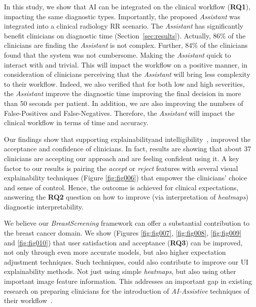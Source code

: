 In this study, we show that AI can be integrated on the clinical workflow ({\bf RQ1}), impacting the same diagnostic types.
Importantly, the proposed {\it Assistant} was integrated into a clinical radiology RR scenario.
The {\it Assistant} has significantly benefit clinicians on diagnostic time (Section~\ref{sec:results}).
Actually, 86\% of the clinicians are finding the {\it Assistant} is not complex.
Further, 84\% of the clinicians found that the system was not cumbersome.
Making the {\it Assistant} quick to interact with and trivial.
This will impact the workflow on a positive manner, in consideration of clinicians perceiving that the {\it Assistant} will bring less complexity to their workflow.
Indeed, we also verified that for both low and high severities, the {\it Assistant} improve the diagnostic time improving the final decision in more than 50 seconds per patient.
In addition, we are also improving the numbers of False-Positives and False-Negatives.
Therefore, the {\it Assistant} will impact the clinical workflow in terms of time and accuracy.

Our findings show that supporting explainability\footnotemark[20] and intelligibility\footnotemark[21]~\cite{Abdul:2018:TTE:3173574.3174156}, improved the acceptance and confidence of clinicians.
In fact, results are showing that about 37 clinicians are accepting our approach and are feeling confident using it.
A key factor to our results is pairing the {\it accept} or {\it reject} features with several visual explainability techniques (Figure \ref{fig:fig006}) that empower the clinicians' choice and sense of control.
Hence, the outcome is achieved for clinical expectations, answering the {\bf RQ2} question on how to improve (via interpretation of {\it heatmaps}) diagnostic interpretability.



We believe our {\it BreastScreening} framework can offer a substantial contribution to the breast cancer domain.
We show (Figures \ref{fig:fig007}, \ref{fig:fig008}, \ref{fig:fig009} and \ref{fig:fig010}) that user satisfaction and acceptance ({\bf RQ3}) can be improved, not only through even more accurate models, but also higher expectation adjustment techniques.
Such techniques, could also contribute to improve our UI explainability methods.
Not just using simple {\it heatmaps}, but also using other important image feature information.
This addresses an important gap in existing research on preparing clinicians for the introduction of {\it AI-Assistive} techniques of their workflow~\cite{Alkhatib:2019:SAT:3290605.3300760, challen2019artificial, shah2019artificial, szolovits2019artificial}.

